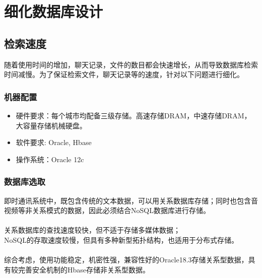 \newpage
{\color{red}
\section{\color{red} 细化数据库设计}

\subsection{\color{red} 检索速度}
随着使用时间的增加，聊天记录，文件的数目都会快速增长，从而导致数据库检索时间减慢。为了保证检索文件，聊天记录等的速度，针对以下问题进行细化。


\subsubsection{\color{red} 机器配置}
\begin{itemize}
    \item 硬件要求：每个城市均配备三级存储。高速存储DRAM，中速存储DRAM，大容量存储机械硬盘。
    \item 软件要求: Oracle, Hbase
    \item 操作系统：Oracle 12c
\end{itemize}
\subsubsection{\color{red} 数据库选取}
即时通讯系统中，既包含传统的文本数据，可以用关系数据库存储；同时也包含音视频等非关系模式的数据，因此必须结合NoSQL数据库进行存储。\\
\\
关系数据库的查找速度较快，但不适于存储多媒体数据；\\
NoSQL的存取速度较慢，但具有多种新型拓扑结构，也适用于分布式存储。\\
\\
综合考虑，使用功能稳定，机密性强，兼容性好的Oracle18.3存储关系型数据，具有较完善安全机制的Hbase存储非关系型数据。

}
